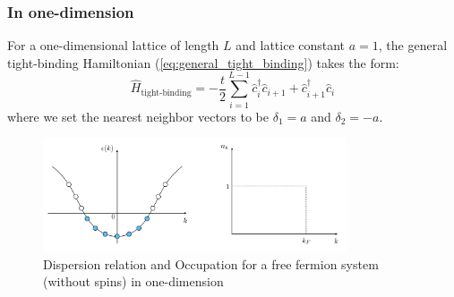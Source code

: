 \documentclass[11pt, a4paper]{article}
\theoremstyle{definition} %
\begin{document}
\subsubsection{In one-dimension}
For a one-dimensional lattice of length $L$ and lattice constant $a = 1$, the general tight-binding Hamiltonian (\ref{eq:general_tight_binding}) takes the form:
\begin{equation}
	\hat{H}_{\text{tight-binding}} =  - \frac{t}{2} \sum_{i=1}^{L-1} \hat{c}_i^\dagger \hat{c}_{i+1} + \hat{c}_{i+1}^\dagger \hat{c}_i
\end{equation}
where we set the nearest neighbor vectors to be $\delta_1 = a$ and $\delta_2 = -a$.

	\begin{figure}[h]	
		\centering
		\includegraphics[width=0.8\textwidth]{Disperion_relation1D}
		\caption{Dispersion relation and Occupation for a free fermion system (without spins) in one-dimension}
	\end{figure}
	
\end{document}
